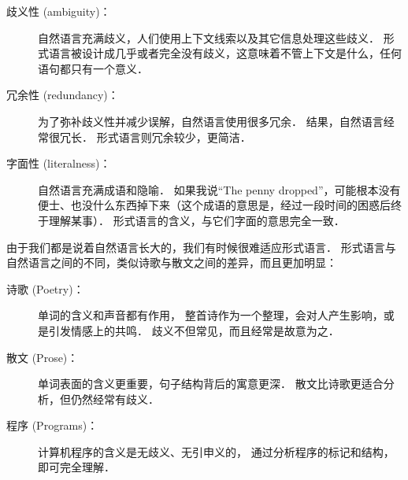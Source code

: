 \begin{description}

\item[歧义性 (ambiguity)：] 自然语言充满歧义，人们使用上下文线索以及其它信息处理这些歧义． 形式语言被设计成几乎或者完全没有歧义，这意味着不管上下文是什么，任何语句都只有一个意义．

\item[冗余性 (redundancy)：] 为了弥补歧义性并减少误解，自然语言使用很多冗余． 结果，自然语言经常很冗长． 形式语言则冗余较少，更简洁．

\item[字面性 (literalness)：] 自然语言充满成语和隐喻． 如果我说``The penny dropped''，可能根本没有便士、也没什么东西掉下来（这个成语的意思是，经过一段时间的困惑后终于理解某事）． 形式语言的含义，与它们字面的意思完全一致．

\end{description}


由于我们都是说着自然语言长大的，我们有时候很难适应形式语言． 形式语言与自然语言之间的不同，类似诗歌与散文之间的差异，而且更加明显：
 


\begin{description}

\item[诗歌 (Poetry)：] 单词的含义和声音都有作用， 整首诗作为一个整理，会对人产生影响，或是引发情感上的共鸣．  歧义不但常见，而且经常是故意为之．

\item[散文 (Prose)：] 单词表面的含义更重要，句子结构背后的寓意更深．  散文比诗歌更适合分析，但仍然经常有歧义．

\item[程序 (Programs)：] 计算机程序的含义是无歧义、无引申义的， 通过分析程序的标记和结构，即可完全理解．

\end{description}

